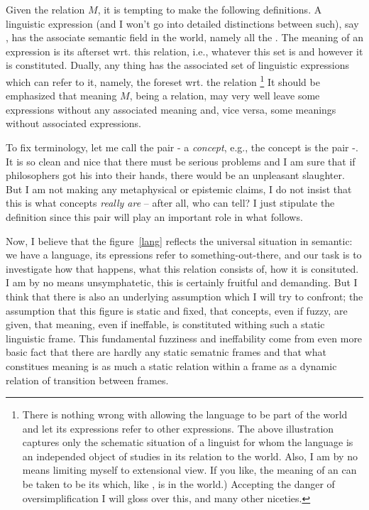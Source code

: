 \documentclass[10pt]{article}
\begin{document}
Given the relation $M$, it is tempting to make the following 
definitions. A linguistic expression (and I won't go into detailed 
distinctions between such), say , has the associate semantic 
field in the world, namely all the . 
The meaning of an expression 
 is its afterset wrt. this relation, i.e., 
whatever this set is and 
however it is constituted. Dually, any thing  has the associated 
set of linguistic expressions which can refer to it, namely, the foreset 
wrt. the relation \footnote{There is nothing wrong with allowing the language 
to be part 
of the world and let its expressions refer to other expressions. The above 
illustration captures only the schematic situation of a linguist for whom
the language is an independed object of studies in its relation to the world.
Also, I am by no means
limiting myself to extensional view. If you like, the meaning of an 
 can be taken to be its  which, 
like , is in the world.)
Accepting the danger of oversimplification I will gloss over this, and many 
other niceties.} 
It should be emphasized that meaning $M$, being a relation, may very well 
leave some expressions without any associated meaning and, vice versa, some 
meanings without associated expressions.
 
To fix terminology, let me call the pair 
- a {\em concept}, e.g., the concept  is 
the pair -.
It is so clean and nice that there must be serious problems and I am sure 
that if philosophers got his into their hands, there would be an 
unpleasant slaughter. But I am not making any metaphysical or epistemic 
claims, I do not insist that this is what concepts {\em really 
are} -- after all, who can tell? I just stipulate the definition since this 
pair will play an important role in what follows.


Now, I believe that the figure~\ref{lang} reflects the universal situation 
in semantic: we have a language, its epressions refer to 
something-out-there, and our task is to investigate how that happens, what 
this relation consists of, how it is consituted. I am by no means 
unsymphatetic, this is certainly fruitful and demanding. But I think that 
there is also an underlying assumption which I will try to confront; the 
assumption that this figure is static and fixed, that concepts, even if 
fuzzy, are given, that meaning, even if ineffable, is constituted withing 
such a static linguistic frame. This fundamental fuzziness and ineffability  
come from even more basic fact that there are hardly any static sematnic 
frames and that what constitues meaning is as much a static relation within 
a frame as a dynamic relation of transition between frames.
\end{document}
